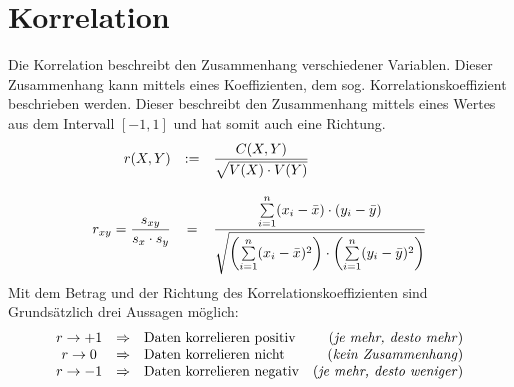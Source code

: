 \section{Korrelation}
Die \gls{Korrelation} beschreibt den Zusammenhang verschiedener Variablen.
Dieser Zusammenhang kann mittels eines Koeffizienten, dem sog. 
\gls{Korrelationskoeffizient} beschrieben werden. Dieser beschreibt den
Zusammenhang mittels eines Wertes aus dem Intervall $[-1,1]$ und
hat somit auch eine Richtung.
\[ \begin{array}{r c l} 
	r(X,Y) 
		& := 
		& \displaystyle \frac{C(X,Y)}{\sqrt{V(X) \cdot V(Y)}} \\
	& & \\
	r_{xy} = \displaystyle \frac{s_{xy}}{s_x \cdot s_y}
		& = 
		& \displaystyle \frac{\sum\limits_{i=1}^n (x_i-\bar{x}) \cdot (y_i-\bar{y})}{
			\sqrt{\left(\sum\limits_{i=1}^n (x_i-\bar{x})^2\right)
			\cdot \left( \sum\limits_{i=1}^n (y_i-\bar{y})^2\right) }} \\
\end{array} \]
Mit dem Betrag und der Richtung des Korrelationskoeffizienten sind 
Grundsätzlich drei Aussagen möglich:
\[ \begin{array}{c c l r}	
	r \rightarrow +1 
		& \Rightarrow 
		& \text{Daten korrelieren positiv} 
		& \text{(\emph{je mehr, desto mehr})} \\
	r \rightarrow 0 
		& \Rightarrow 
		& \text{Daten korrelieren nicht}
		& \text{(\emph{kein Zusammenhang})} \\
	r \rightarrow -1 
		& \Rightarrow 
		& \text{Daten korrelieren negativ}
		& \text{(\emph{je mehr, desto weniger})}
\end{array} \]
